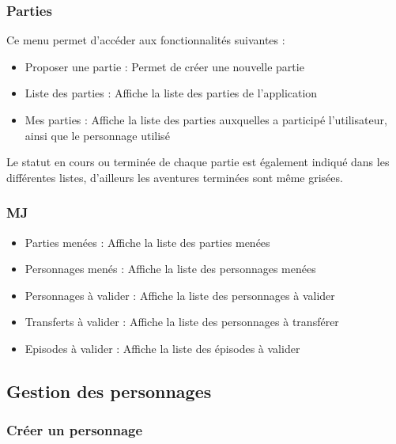 \documentclass[a4paper, 11pt, titlepage]{article}
\begin{document}
\subsubsection {Parties}

Ce menu permet d'accéder aux fonctionnalités suivantes :

\begin{itemize}
\item
Proposer une partie : Permet de créer une nouvelle partie

\item
Liste des parties : Affiche la liste des parties de l'application

\item
Mes parties : Affiche la liste des parties auxquelles a participé l'utilisateur, ainsi que le personnage utilisé

\end{itemize}

Le statut en cours ou terminée de chaque partie est également indiqué dans les différentes listes, d'ailleurs les aventures terminées sont même grisées.


\subsubsection {MJ}

\begin{itemize}
\item
Parties menées : Affiche la liste des parties menées

\item
Personnages menés : Affiche la liste des personnages menées

\item
Personnages à valider : Affiche la liste des personnages à valider

\item
Transferts à valider : Affiche la liste des personnages à transférer

\item
Episodes à valider : Affiche la liste des épisodes à valider

\end{itemize}


\subsection {Gestion des personnages}

\subsubsection {Créer un personnage}
\end{document}
